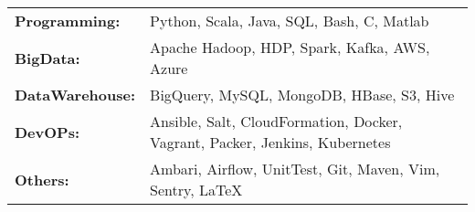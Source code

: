 \begin{flushleft}
\begin{tabular}{@{}l l}
  \textbf{Programming:} & Python, Scala, Java, SQL, Bash, C, Matlab\\
  \textbf{BigData:} & Apache Hadoop, HDP, Spark, Kafka, AWS, Azure\\
  \textbf{DataWarehouse:} & BigQuery, MySQL, MongoDB, HBase, S3, Hive\\
  \textbf{DevOPs:} & Ansible, Salt, CloudFormation, Docker, Vagrant, Packer, Jenkins, Kubernetes\\
  \textbf{Others:} & Ambari, Airflow, UnitTest, Git, Maven, Vim, Sentry, \LaTeX
\end{tabular}
\end{flushleft}

